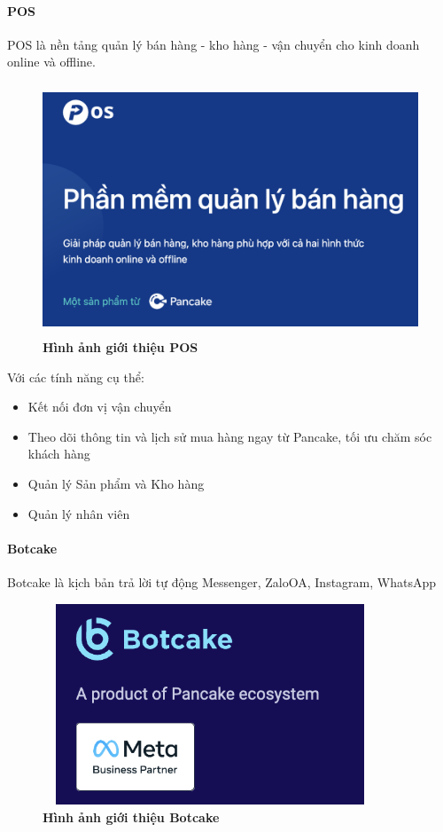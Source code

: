 \paragraph{POS \cite{pos}}
\mbox{}

POS là nền tảng quản lý bán hàng - kho hàng - vận chuyển cho kinh doanh online và offline.
\begin{figure}[H]
  \centering
  \includegraphics[width=12cm,height=7.5cm]{Images/pancake/pos.png}
  \caption[Hình ảnh giới thiệu POS]{\bfseries \fontsize{12pt}{0pt}
  \selectfont Hình ảnh giới thiệu POS}
  \label{ttlk} %
\end{figure}
Với các tính năng cụ thể: 
\begin{itemize}
  \item Kết nối đơn vị vận chuyển
  \item Theo dõi thông tin và lịch sử mua hàng ngay từ Pancake, tối ưu chăm sóc khách hàng
  \item Quản lý Sản phẩm và Kho hàng
  \item Quản lý nhân viên
\end{itemize}

\paragraph{Botcake \cite{botcake}}
\mbox{}

Botcake là kịch bản trả lời tự động Messenger, ZaloOA, Instagram, WhatsApp
\begin{figure}[H]
  \centering
  \includegraphics[width=10cm,height=6cm]{Images/pancake/botcake.png}
  \caption[Hình ảnh giới thiệu Botcake]{\bfseries \fontsize{12pt}{0pt}
  \selectfont Hình ảnh giới thiệu Botcake}
  \label{ttlk} %
\end{figure}

